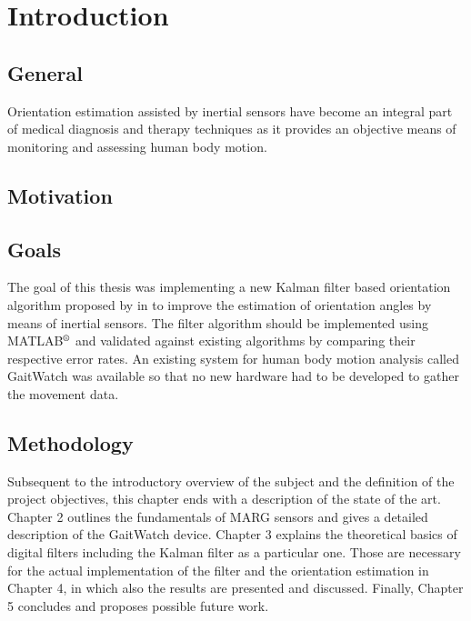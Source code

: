 \chapter{Introduction}
\label{ch:Introduction}

\section{General}

Orientation estimation assisted by inertial sensors have become an integral part of medical diagnosis and therapy techniques as it provides an objective means of monitoring and assessing human body motion.

\section{Motivation}


\section{Goals}

The goal of this thesis was implementing a new Kalman filter based orientation algorithm proposed by \citeauthor{bennett_motion_2014} in \cite{bennett_motion_2014} to improve the estimation of orientation angles by means of inertial sensors. The filter algorithm should be implemented using MATLAB$\textsuperscript{\textregistered}$ and validated against existing algorithms by comparing their respective error rates. An existing system for human body motion analysis called GaitWatch was available so that no new hardware had to be developed to gather the movement data.

\section{Methodology}

Subsequent to the introductory overview of the subject and the definition of the project objectives, this chapter ends with a description of the state of the art. Chapter 2 outlines the fundamentals of MARG sensors and gives a detailed description of the GaitWatch device. Chapter 3 explains the theoretical basics of digital filters including the Kalman filter as a particular one. Those are necessary for the actual implementation of the filter and the orientation estimation in Chapter 4, in which also the results are presented and discussed. Finally, Chapter 5 concludes and proposes possible future work.

